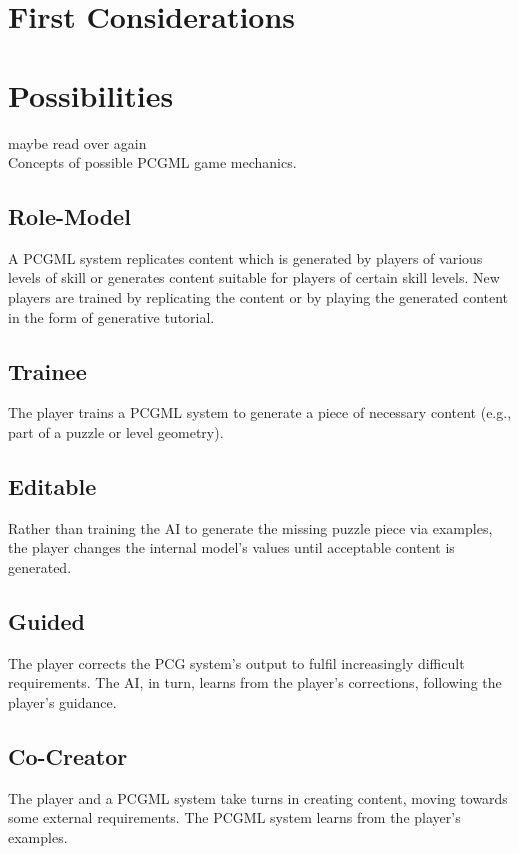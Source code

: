 \documentclass[MGS,Master,english]{twbook}%
\begin{document}
\section{First Considerations}

\section{Possibilities}
maybe read over \cite{pcg::endlessWeb} again\\
Concepts of possible PCGML game mechanics.

\subsection{Role-Model}
A \ac{PCGML} system replicates content which is generated by players of various levels of skill or generates content suitable for players of certain skill levels. New players are trained by replicating the content or by playing the generated content in the form of generative tutorial. \cite{pcgml::paper}

\subsection{Trainee}
The player trains a \ac{PCGML} system to generate a piece of necessary content (e.g., part of a puzzle or level geometry). \cite{pcgml::paper}

\subsection{Editable}
Rather than training the AI to generate the missing puzzle piece via examples, the player changes the internal model’s values until acceptable content is generated. \cite{pcgml::paper}

\subsection{Guided}
The player corrects the \ac{PCG} system’s output to fulfil increasingly difficult requirements. The \ac{AI}, in turn, learns from the player’s corrections, following the player’s guidance. \cite{pcgml::paper}

\subsection{Co-Creator}
The player and a \ac{PCGML} system take turns in creating content, moving towards some external requirements. The \ac{PCGML} system learns from the player’s examples. \cite{pcgml::paper} 
\end{document}

